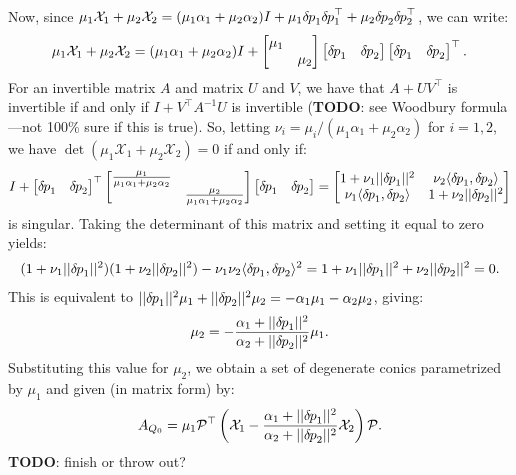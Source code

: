 \documentclass{article}
\begin{document}
Now, since
$\mu_1 \mathcal{X}_1 + \mu_2 \mathcal{X}_2 = (\mu_1 \alpha_1 + \mu_2 \alpha_2) I + \mu_1
{\delta \hspace{-0.08em} p}_1 {\delta \hspace{-0.08em} p}_1^\top + \mu_2 {\delta \hspace{-0.08em} p}_2 {\delta \hspace{-0.08em} p}_2^\top$, we can write:
\begin{align*}
  \mu_1 \mathcal{X}_1 + \mu_2 \mathcal{X}_2 = (\mu_1 \alpha_1 + \mu_2 \alpha_2) I + \begin{bmatrix} \mu_1 & \\ & \mu_2 \end{bmatrix} \begin{bmatrix} {\delta \hspace{-0.08em} p}_1 & {\delta \hspace{-0.08em} p}_2 \end{bmatrix} \begin{bmatrix} {\delta \hspace{-0.08em} p}_1 & {\delta \hspace{-0.08em} p}_2 \end{bmatrix}^\top.
\end{align*}
For an invertible matrix $A$ and matrix $U$ and $V$, we have that
$A + UV^\top$ is invertible if and only if $I + V^\top A^{-1} U$ is
invertible (\textbf{TODO}: see Woodbury formula---not 100\% sure if
this is true). So, letting
$\nu_i = \mu_i/(\mu_1 \alpha_1 + \mu_2 \alpha_2)$ for $i = 1, 2$, we
have $\det(\mu_1 \mathcal{X}_1 + \mu_2 \mathcal{X}_2) = 0$ if and only if:
\begin{align*}
  I + \begin{bmatrix} {\delta \hspace{-0.08em} p}_1 & {\delta \hspace{-0.08em} p}_2 \end{bmatrix}^\top \begin{bmatrix} \frac{\mu_1}{\mu_1 \alpha_1 + \mu_2 \alpha_2} & \\ & \frac{\mu_2}{\mu_1 \alpha_1 + \mu_2 \alpha_2} \end{bmatrix} \begin{bmatrix} {\delta \hspace{-0.08em} p}_1 & {\delta \hspace{-0.08em} p}_2 \end{bmatrix} = \begin{bmatrix} 1 + \nu_1 ||{\delta \hspace{-0.08em} p}_1||^2 & \nu_2 \langle {\delta \hspace{-0.08em} p}_1, {\delta \hspace{-0.08em} p}_2 \rangle \\ \nu_1 \langle {\delta \hspace{-0.08em} p}_1, {\delta \hspace{-0.08em} p}_2 \rangle & 1 + \nu_2 ||{\delta \hspace{-0.08em} p}_2||^2 \end{bmatrix}
\end{align*}
is singular. Taking the determinant of this matrix and setting it
equal to zero yields:
\begin{align*}
  {(1 + \nu_1 ||{\delta \hspace{-0.08em} p}_1||^2)}{(1 + \nu_2 ||{\delta \hspace{-0.08em} p}_2||^2)} - \nu_1 \nu_2 \langle {\delta \hspace{-0.08em} p}_1, {\delta \hspace{-0.08em} p}_2 \rangle^2 = 1 + \nu_1 ||{\delta \hspace{-0.08em} p}_1||^2 + \nu_2 ||{\delta \hspace{-0.08em} p}_2||^2 = 0.
\end{align*}
This is equivalent to $||{\delta \hspace{-0.08em} p}_1||^2 \mu_1 + ||{\delta \hspace{-0.08em} p}_2||^2 \mu_2 = -\alpha_1 \mu_1 - \alpha_2 \mu_2$, giving:
\begin{align*}
  \mu_2 = -\frac{\alpha_1 + ||{\delta \hspace{-0.08em} p}_1||^2}{\alpha_2 + ||{\delta \hspace{-0.08em} p}_2||^2} \mu_1.
\end{align*}
Substituting this value for $\mu_2$, we obtain a set of degenerate
conics parametrized by $\mu_1$ and given (in matrix form) by:
\begin{align*}
  A_{Q_0} = \mu_1 \mathcal{P}^\top \left(\mathcal{X}_1 - \frac{\alpha_1 + ||{\delta \hspace{-0.08em} p}_1||^2}{\alpha_2 + ||{\delta \hspace{-0.08em} p}_2||^2} \mathcal{X}_2\right) \mathcal{P}.
\end{align*}
\textbf{TODO}: finish or throw out?
\end{document}
